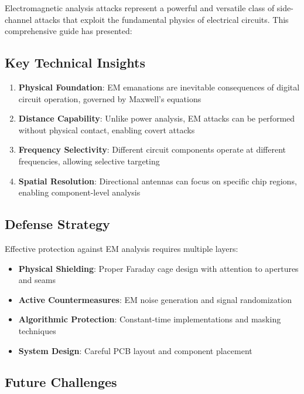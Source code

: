 \documentclass[11pt,a4paper]{article}
\theoremstyle{definition}
\begin{document}
Electromagnetic analysis attacks represent a powerful and versatile class of side-channel attacks that exploit the fundamental physics of electrical circuits. This comprehensive guide has presented:

\subsection{Key Technical Insights}

\begin{enumerate}
    \item \textbf{Physical Foundation}: EM emanations are inevitable consequences of digital circuit operation, governed by Maxwell's equations
    
    \item \textbf{Distance Capability}: Unlike power analysis, EM attacks can be performed without physical contact, enabling covert attacks
    
    \item \textbf{Frequency Selectivity}: Different circuit components operate at different frequencies, allowing selective targeting
    
    \item \textbf{Spatial Resolution}: Directional antennas can focus on specific chip regions, enabling component-level analysis
\end{enumerate}

\subsection{Defense Strategy}

Effective protection against EM analysis requires multiple layers:

\begin{itemize}
    \item \textbf{Physical Shielding}: Proper Faraday cage design with attention to apertures and seams
    \item \textbf{Active Countermeasures}: EM noise generation and signal randomization
    \item \textbf{Algorithmic Protection}: Constant-time implementations and masking techniques
    \item \textbf{System Design}: Careful PCB layout and component placement
\end{itemize}

\subsection{Future Challenges}
\end{document}
